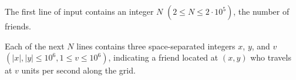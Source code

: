 
The first line of input contains an integer $N$ $(2 \leq N \leq 2 \cdot 10^{5})$, the number of friends.

Each of the next $N$ lines contains three space-separated integers $x$, $y$, and $v$ $(|x|, |y| \leq 10^{6}, 1 \leq v \leq 10^{6})$, indicating a friend located at $(x,y)$ who travels at $v$ units per second along the grid.
 
